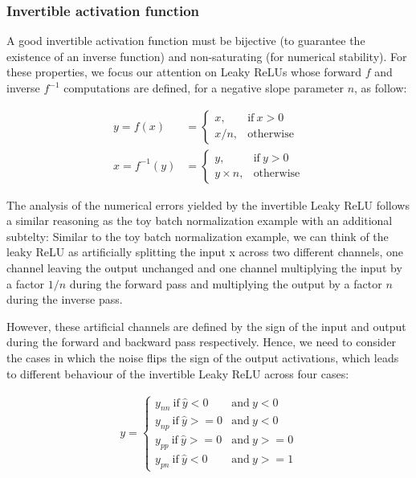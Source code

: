 \documentclass[twocolumn]{bmcart}
\begin{document}
\subsubsection{Invertible activation function}

A good invertible activation function must be bijective (to guarantee the existence of an inverse function) and non-saturating (for numerical stability).
For these properties, we focus our attention on Leaky ReLUs whose forward $f$ and inverse $f^{-1}$ computations are defined, for a negative slope parameter $n$, as follow:

\begin{subequations}
\begin{align}
y = f(x) &=      \begin{cases}
x, & \text{if}\ x>0 \\
x / n, & \text{otherwise}
\end{cases} \\
x = f^{-1}(y) &= \begin{cases}
y, & \text{if}\ y>0 \\
y \times n, & \text{otherwise}
\end{cases} 
\end{align}
\end{subequations}

The analysis of the numerical errors yielded by the invertible Leaky ReLU follows a similar reasoning as the toy batch normalization example with an additional subtelty:
Similar to the toy batch normalization example, we can think of the leaky ReLU as artificially splitting the input x across two different channels, one channel leaving the output unchanged and one channel multiplying the input by a factor $1/n$ during the forward pass and multiplying the output by a factor $n$ during the inverse pass.

However, these artificial channels are defined by the sign of the input and output during the forward and backward pass respectively.
Hence, we need to consider the cases in which the noise flips the sign of the output activations, 
which leads to different behaviour of the invertible Leaky ReLU across four cases: 

\begin{subequations}
\begin{align}
y = \begin{cases}
y_{nn} \  \text{if}\  \hat{y}<0    &\text{and}\  y<0  \\
y_{np} \  \text{if}\  \hat{y}>=0   &\text{and}\  y<0  \\
y_{pp} \  \text{if}\  \hat{y}>=0   &\text{and}\  y>=0 \\
y_{pn} \  \text{if}\  \hat{y}<0    &\text{and}\  y>=1 
\end{cases} 
\end{align}
\end{subequations}
\end{document}
